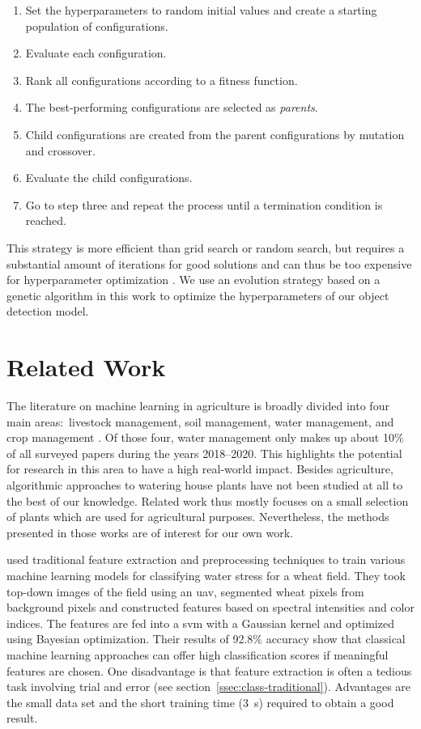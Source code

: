 \documentclass[draft,final]{vutinfth} %
\begin{document}
\begin{enumerate}
\item Set the hyperparameters to random initial values and create a
  starting population of configurations.
\item Evaluate each configuration.
\item Rank all configurations according to a fitness function.
\item The best-performing configurations are selected as
  \emph{parents}.
\item Child configurations are created from the parent configurations
  by mutation and crossover.
\item Evaluate the child configurations.
\item Go to step three and repeat the process until a termination
  condition is reached.
\end{enumerate}

This strategy is more efficient than grid search or random search, but
requires a substantial amount of iterations for good solutions and can
thus be too expensive for hyperparameter optimization
\cite{bischl2023}. We use an evolution strategy based on a genetic
algorithm in this work to optimize the hyperparameters of our object
detection model.

\section{Related Work}
\label{sec:related-work}

The literature on machine learning in agriculture is broadly divided
into four main areas:~livestock management, soil management, water
management, and crop management \cite{benos2021}. Of those four, water
management only makes up about 10\% of all surveyed papers during the
years 2018--2020. This highlights the potential for research in this
area to have a high real-world impact. Besides agriculture,
algorithmic approaches to watering house plants have not been studied
at all to the best of our knowledge. Related work thus mostly focuses
on a small selection of plants which are used for agricultural
purposes. Nevertheless, the methods presented in those works are of
interest for our own work.

\textcite{su2020} used traditional feature extraction and
preprocessing techniques to train various machine learning models for
classifying water stress for a wheat field. They took top-down images
of the field using an \gls{uav}, segmented wheat pixels from
background pixels and constructed features based on spectral
intensities and color indices. The features are fed into a \gls{svm}
with a Gaussian kernel and optimized using Bayesian
optimization. Their results of 92.8\% accuracy show that classical
machine learning approaches can offer high classification scores if
meaningful features are chosen. One disadvantage is that feature
extraction is often a tedious task involving trial and error (see
section~\ref{ssec:class-traditional}). Advantages are the small data
set and the short training time (\qty{3}{\s}) required to obtain a
good result.
\end{document}
